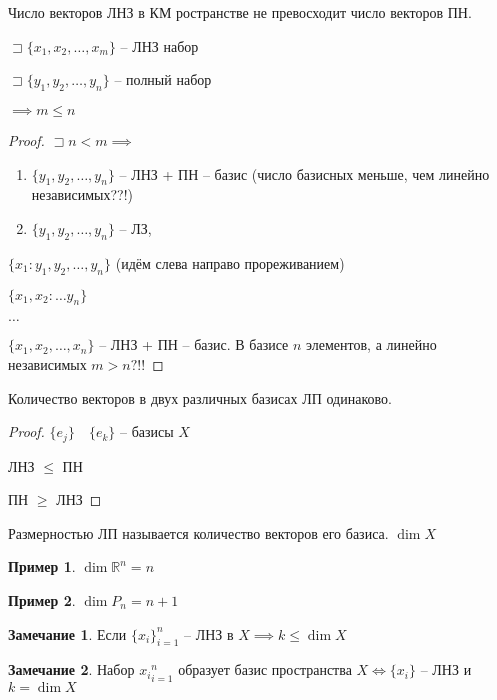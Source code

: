 \documentclass{book}
\newcommand\R{\ensuremath{\mathbb{R}}}
\theoremstyle{definition}
\newtheorem*{note}{Замечание}
\newtheorem*{example}{Пример}
\begin{document}
\begin{lemma}
    Число векторов ЛНЗ в КМ ространстве не превосходит число векторов ПН. 

    $\sqsupset \{x_1, x_2, \ldots, x_m\}$ -- ЛНЗ набор

    $\sqsupset \{y_1, y_2, \ldots, y_n\}$ -- полный набор

    $\implies m\leqslant n$
\end{lemma}
\begin{proof}
    $\sqsupset n < m \implies $
    \begin{enumerate}
        \item $\{y_1, y_2, \ldots, y_n\}$ -- ЛНЗ + ПН -- базис (число базисных меньше, чем линейно независимых??!)
        \item $\{y_1, y_2, \ldots, y_n\}$ -- ЛЗ, 
    \end{enumerate}

    $\{x_1:y_1,y_2,\ldots,y_n\}$ (идём слева направо прореживанием)

    $\{x_1,x_2:\ldots y_n\}$ 

    $\ldots$

    $\{x_1, x_2, \ldots, x_n\}$ -- ЛНЗ + ПН -- базис. В базисе $n$ элементов, а линейно независимых $m>n?!!$
\end{proof}

\begin{lemma}
    Количество векторов в двух различных базисах ЛП одинаково.
\end{lemma}
\begin{proof}
    $\{e_j\}\quad\{e_k\}$ -- базисы  $X$

    ЛНЗ  $\leqslant $ ПН

    ПН $\geqslant $ ЛНЗ
\end{proof}

\begin{definition}
    Размерностью ЛП называется количество векторов его базиса. $\dim X$
\end{definition}

\begin{example}
    $\dim \R^n = n$
\end{example}

\begin{example}
    $\dim P_n = n+1$
\end{example}
\begin{note}
    Если $\{x_i\}_{i=1}^n$ -- ЛНЗ в  $X \implies k\leqslant \dim X$
\end{note}
\begin{note}
    Набор ${x_i}_{i=1}^n $ образует базис пространства $X \iff  \{x_i\}$ -- ЛНЗ и $k = \dim X $  
\end{note}
\end{document}
